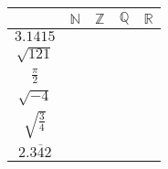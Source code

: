 \begin{questions}
\begin{minipage}{\linewidth}
\begin{multicols}{2}
		\begin{tabular}{|c|c|c|c|c|}
			\hline
			& $ \mathbb{N}$ & $ \mathbb{Z}  $ & $ \mathbb{Q}$ & $ \mathbb{R} $ \\
			\hline
			$ 3.1415 $       &               &                 &    \solonly{\checkmark }            &      \solonly{\checkmark }           \\
			\hline
			$ \sqrt{121} $     &  \solonly{\checkmark }              &    \solonly{\checkmark }              &   \solonly{\checkmark }             &   \solonly{\checkmark }              \\
			\hline
			$ \frac{\pi}{2} $    &               &                 &               &   \solonly{\checkmark }              \\
			\hline
			$ \sqrt{-4} $      &               &                 &               &                \\
			\hline
			$ \sqrt{\frac{3}{4}} $ &               &                 &               &    \solonly{\checkmark }             \\
			\hline
			$ 2.\overline{342} $  &               &                 &    \solonly{\checkmark }            &    \solonly{\checkmark }             \\
			\hline
		\end{tabular}
		
	\end{multicols}
\end{minipage}



\end{questions}


